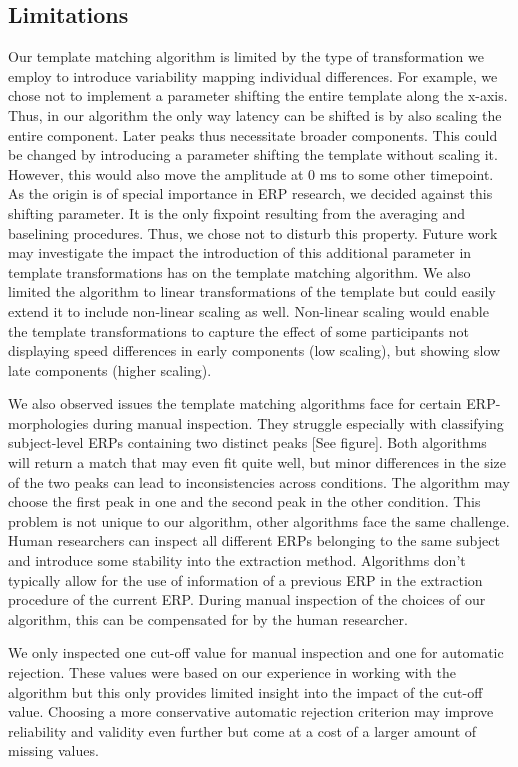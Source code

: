 \documentclass[
  man,floatsintext]{apa7}
\begin{document}
\hypertarget{limitations}{%
\subsection{Limitations}\label{limitations}}

Our template matching algorithm is limited by the type of transformation we employ to introduce variability mapping individual differences. For example, we chose not to implement a parameter shifting the entire template along the x-axis. Thus, in our algorithm the only way latency can be shifted is by also scaling the entire component. Later peaks thus necessitate broader components. This could be changed by introducing a parameter shifting the template without scaling it. However, this would also move the amplitude at 0 ms to some other timepoint. As the origin is of special importance in ERP research, we decided against this shifting parameter. It is the only fixpoint resulting from the averaging and baselining procedures. Thus, we chose not to disturb this property. Future work may investigate the impact the introduction of this additional parameter in template transformations has on the template matching algorithm. We also limited the algorithm to linear transformations of the template but could easily extend it to include non-linear scaling as well. Non-linear scaling would enable the template transformations to capture the effect of some participants not displaying speed differences in early components (low scaling), but showing slow late components (higher scaling).

We also observed issues the template matching algorithms face for certain ERP-morphologies during manual inspection. They struggle especially with classifying subject-level ERPs containing two distinct peaks {[}See figure{]}. Both algorithms will return a match that may even fit quite well, but minor differences in the size of the two peaks can lead to inconsistencies across conditions. The algorithm may choose the first peak in one and the second peak in the other condition. This problem is not unique to our algorithm, other algorithms face the same challenge. Human researchers can inspect all different ERPs belonging to the same subject and introduce some stability into the extraction method. Algorithms don't typically allow for the use of information of a previous ERP in the extraction procedure of the current ERP. During manual inspection of the choices of our algorithm, this can be compensated for by the human researcher.

We only inspected one cut-off value for manual inspection and one for automatic rejection. These values were based on our experience in working with the algorithm but this only provides limited insight into the impact of the cut-off value. Choosing a more conservative automatic rejection criterion may improve reliability and validity even further but come at a cost of a larger amount of missing values.
\end{document}
